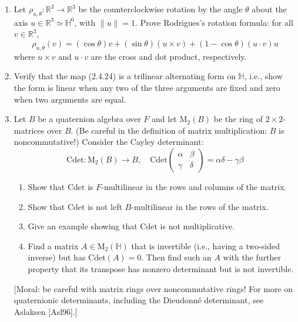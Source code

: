 \documentclass{article}
\theoremstyle{definition}
\begin{document}
\begin{enumerate}
\item Let $\rho_{u,\theta}: \mathbb{R}^3 \to \mathbb{R}^3$ be the counterclockwise rotation by the angle $\theta$ about the axis $u \in \mathbb{R}^3 \simeq \mathbb{H}^0$, with $\|u\| = 1$. Prove Rodrigues's rotation formula: for all $v \in \mathbb{R}^3$,
$$\rho_{u,\theta}(v) = (\cos \theta)v + (\sin \theta)(u \times v) + (1 - \cos \theta)(u \cdot v)u$$
where $u \times v$ and $u \cdot v$ are the cross and dot product, respectively.

\item Verify that the map (2.4.24) is a trilinear alternating form on $\mathbb{H}$, i.e., show the form is linear when any two of the three arguments are fixed and zero when two arguments are equal.

\item Let $B$ be a quaternion algebra over $F$ and let $\mathrm{M}_2(B)$ be the ring of $2 \times 2$-matrices over $B$. (Be careful in the definition of matrix multiplication: $B$ is noncommutative!) Consider the Cayley determinant:
$$\mathrm{Cdet}: \mathrm{M}_2(B) \to B, \quad \mathrm{Cdet} \begin{pmatrix} \alpha & \beta \\ \gamma & \delta \end{pmatrix} = \alpha \delta - \gamma \beta$$
\begin{enumerate}[label=(\alph*)]
\item Show that $\mathrm{Cdet}$ is $F$-multilinear in the rows and columns of the matrix.
\item Show that $\mathrm{Cdet}$ is not left $B$-multilinear in the rows of the matrix.
\item Give an example showing that $\mathrm{Cdet}$ is not multiplicative.
\item Find a matrix $A \in \mathrm{M}_2(\mathbb{H})$ that is invertible (i.e., having a two-sided inverse) but has $\mathrm{Cdet}(A) = 0$. Then find such an $A$ with the further property that its transpose has nonzero determinant but is not invertible.
\end{enumerate}
[Moral: be careful with matrix rings over noncommutative rings! For more on quaternionic determinants, including the Dieudonn\'{e} determinant, see Aslaksen [Asl96].]
\end{enumerate}
\end{document}
